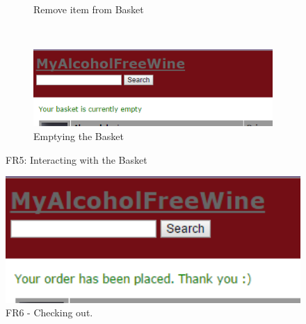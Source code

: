 \documentclass[12pt]{article}
\begin{document}
\begin{figure}[H]
\begin{subfigure}[b]{0.3\textwidth}
        \caption{Remove item from Basket}
        \label{fig:FR5 Remove item from Basket}
    \end{subfigure}
    ~ %
    \begin{subfigure}[b]{0.3\textwidth}
        \includegraphics[width=\textwidth]{assets/FR5_screen_3}
        \caption{Emptying the Basket}
        \label{fig:FR5 empty basket}
    \end{subfigure}
    \caption{FR5: Interacting with the Basket}\label{fig:FR5 Basket}
\end{figure}

\begin{figure}[H]
        \centering
                \includegraphics[width=1\textwidth]{assets/FR6_screen1}
                \caption{FR6 - Checking out.}
                \label{fig: FR6_1.} 
\end{figure}
\end{document}

